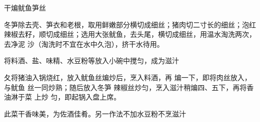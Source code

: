 \begin{recipe}{干煸鱿鱼笋丝}

\ingredients


\preparation

\step 冬笋除去壳、笋衣和老根，取用鲜嫩部分横切成细丝；猪肉切二寸长的细丝；泡红
辣椒去籽，顺切成细丝；选用大张鱿鱼，去头尾，横切成细丝，用温水淘洗两次，去净泥
沙（淘洗时不宜在水中久泡），挤干水待用。

\step 将料酒、盐、味精、水豆粉等放入小碗中搅匀，成为滋汁

夂将猪油入锅烧红，放入鱿鱼丝煸炒后，烹入料酒，再 煸一下，即将肉丝放入，与鱿鱼
丝一同炒熟；随后放入冬笋 辣椒丝炒匀，烹入滋汁稍煸四、五下，再将香油淋于菜 上炒
匀，即起锅入盘上席。

\features

此菜干香味美，为佐酒佳肴。另一作法不加水豆粉不烹滋汁

\end{recipe}


